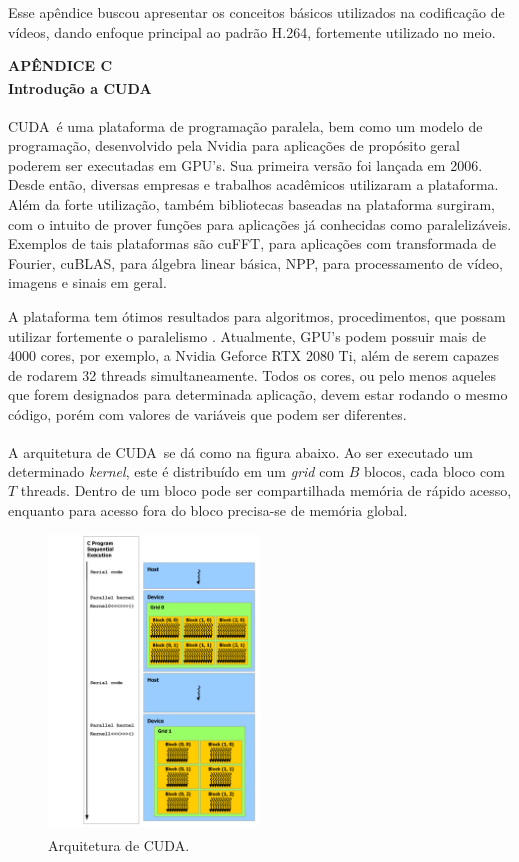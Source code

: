 \documentclass[cic,tc]{iiufrgs}
\newcommand{\reg}{\textsuperscript{\textregistered}}
\begin{document}
Esse apêndice buscou apresentar os conceitos básicos utilizados na codificação de vídeos, 
dando enfoque principal ao padrão H.264, fortemente utilizado no meio.
\newpage
{
    \centering
    \textbf{APÊNDICE C} \\
    \textbf{Introdução a CUDA\reg} \par
}
\vspace{1em}

CUDA\reg~é uma plataforma de programação paralela, bem como um modelo de programação, 
desenvolvido pela Nvidia para aplicações de propósito geral poderem ser executadas
em GPU's.
Sua primeira versão foi lançada em 2006.
Desde então, diversas empresas e trabalhos acadêmicos utilizaram a plataforma.
Além da forte utilização, também bibliotecas baseadas na plataforma surgiram, 
com o intuito de prover funções para aplicações já conhecidas como paralelizáveis.
Exemplos de tais plataformas são cuFFT, para aplicações com transformada de Fourier,
cuBLAS, para álgebra linear básica, NPP, para processamento de vídeo, imagens e 
sinais em geral.

A plataforma tem ótimos resultados para algoritmos, procedimentos, que possam utilizar
fortemente o paralelismo \cite{CUDAMAIN}.
Atualmente, GPU's podem possuir mais de 4000 cores, por exemplo, a Nvidia Geforce RTX 2080 Ti,
além de serem capazes de rodarem 32 threads simultaneamente.
Todos os cores, ou pelo menos aqueles que forem designados para determinada aplicação,
devem estar rodando o mesmo código, porém com valores de variáveis que podem ser diferentes.

A arquitetura de CUDA\reg~se dá como na figura abaixo.
Ao ser executado um determinado \textit{kernel}, este é distribuído em um \textit{grid}
com $B$ blocos, cada bloco com $T$ threads.
Dentro de um bloco pode ser compartilhada memória de rápido acesso, enquanto para 
acesso fora do bloco precisa-se de memória global.
\begin{figure}[H]
    \caption{Arquitetura de CUDA\reg.}
    \begin{center}
        \includegraphics[width=0.5\textwidth]{img/CUDAarch.png}
    \end{center}
\end{figure}
\end{document}

